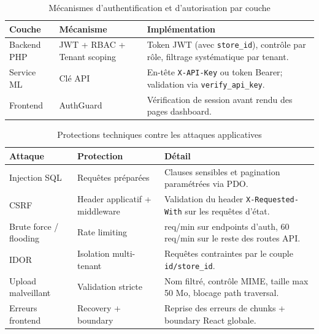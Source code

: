 \documentclass[12pt,a4paper]{report}
\begin{document}
\begin{table}[H]
\centering
\caption{M\'{e}canismes d'authentification et d'autorisation par couche}
\label{tab:security_auth}
\begin{tabularx}{\textwidth}{>{\raggedright\arraybackslash}p{} >{\raggedright\arraybackslash}p{} >{\raggedright\arraybackslash}X}
\toprule
\textbf{Couche} & \textbf{M\'{e}canisme} & \textbf{Impl\'{e}mentation} \\
\midrule
Backend PHP & JWT + RBAC + Tenant scoping & Token JWT (avec \texttt{store\_id}), contr\^{o}le par r\^{o}le, filtrage syst\'{e}matique par tenant. \\
Service ML & Cl\'{e} API & En-t\^{e}te \texttt{X-API-Key} ou token Bearer; validation via \texttt{verify\_api\_key}. \\
Frontend & AuthGuard & V\'{e}rification de session avant rendu des pages dashboard. \\
\bottomrule
\end{tabularx}
\end{table}

\begin{table}[H]
\centering
\caption{Protections techniques contre les attaques applicatives}
\label{tab:security_protections}
\begin{tabularx}{\textwidth}{>{\raggedright\arraybackslash}p{} >{\raggedright\arraybackslash}p{} >{\raggedright\arraybackslash}X}
\toprule
\textbf{Attaque} & \textbf{Protection} & \textbf{D\'{e}tail} \\
\midrule
Injection SQL & Requ\^{e}tes pr\'{e}par\'{e}es & Clauses sensibles et pagination param\'{e}tr\'{e}es via PDO. \\
CSRF & Header applicatif + middleware & Validation du header \texttt{X-Requested-With} sur les requ\^{e}tes d'\'{e}tat. \\
Brute force / flooding & Rate limiting & 5 req/min sur endpoints d'auth, 60 req/min sur le reste des routes API. \\
IDOR & Isolation multi-tenant & Requ\^{e}tes contraintes par le couple \texttt{id/store\_id}. \\
Upload malveillant & Validation stricte & Nom filtr\'{e}, contr\^{o}le MIME, taille max 50 Mo, blocage path traversal. \\
Erreurs frontend & Recovery + boundary & Reprise des erreurs de chunks + boundary React globale. \\
\bottomrule
\end{tabularx}
\end{table}
\end{document}
